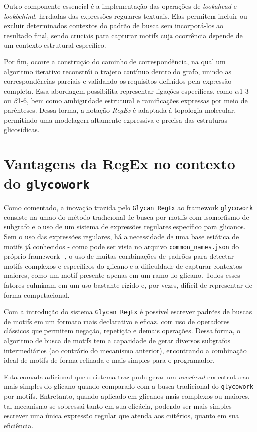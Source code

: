 Outro componente essencial é a implementação das operações de
\textit{lookahead} e \textit{lookbehind}, herdadas das expressões regulares
textuais. Elas permitem incluir ou excluir determinados contextos do padrão de
busca sem incorporá-los ao resultado final, sendo cruciais para capturar motifs
cuja ocorrência depende de um contexto estrutural específico.

Por fim, ocorre a construção do caminho de correspondência, na qual um
algoritmo iterativo reconstrói o trajeto contínuo dentro do grafo, unindo as
correspondências parciais e validando os requisitos definidos pela expressão
completa. Essa abordagem possibilita representar ligações específicas, como
$\alpha$1-3 ou $\beta$1-6, bem como ambiguidade estrutural e ramificações
expressas por meio de parênteses. Dessa forma, a notação \textit{RegEx} é
adaptada à topologia molecular, permitindo uma modelagem altamente expressiva e
precisa das estruturas glicosídicas.

\section{Vantagens da RegEx no contexto do \texttt{glycowork}}

Como comentado, a inovação trazida pelo \texttt{Glycan RegEx} ao framework
\texttt{glycowork} consiste na união do método tradicional de busca por motifs
com isomorfismo de subgrafo e o uso de um sistema de expressões regulares
específico para glicanos. \\

Sem o uso das expressões regulares, há a necessidade de uma base estática de
motifs já conhecidos - como pode ser vista no arquivo
\texttt{common\_names.json} do próprio framework -, o uso de muitas combinações
de padrões para detectar motifs complexos e específicos do glicano e a
dificuldade de capturar contextos maiores, como um motif presente apenas em um
ramo do glicano. Todos esses fatores culminam em um uso bastante rígido e, por
vezes, difícil de representar de forma computacional.

Com a introdução do sistema \texttt{Glycan RegEx} é possível escrever padrões
de buscas de motifs em um formato mais declarativo e eficaz, com uso de
operadores clássicos que permitem negação, repetição e demais operações. Dessa
forma, o algoritmo de busca de motifs tem a capacidade de gerar diversos
subgrafos intermediários (ao contrário do mecanismo anterior), encontrando a
combinação ideal de motifs de forma refinada e mais simples para o programador.

Esta camada adicional que o sistema traz pode gerar um \textit{overhead} em
estruturas mais simples do glicano quando comparado com a busca tradicional do
\texttt{glycowork} por motifs. Entretanto, quando aplicado em glicanos mais
complexos ou maiores, tal mecanismo se sobressai tanto em sua eficácia, podendo
ser mais simples escrever uma única expressão regular que atenda aos critérios,
quanto em sua eficiência.


